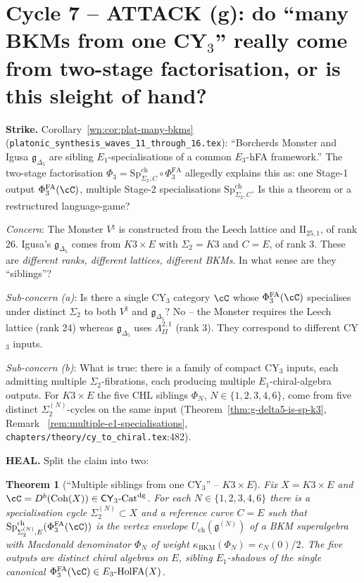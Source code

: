 \documentclass[11pt]{article}
\newtheorem{theorem}{Theorem}
\theoremstyle{definition}
\providecommand{\CY}{\mathsf{CY}}
\providecommand{\PhiFA}{\Phi^{\mathrm{FA}}}
\providecommand{\SpCh}{\mathrm{Sp}^{\mathrm{ch}}}
\providecommand{\HolFA}{\mathrm{HolFA}}
\providecommand{\Eone}{E_1}
\providecommand{\Coh}{\mathrm{Coh}}
\providecommand{\kBKM}{\kappa_{\mathrm{BKM}}}
\begin{document}
\section*{Cycle 7 -- ATTACK (g): do ``many BKMs from one CY$_3$'' really
come from two-stage factorisation, or is this sleight of hand?}

\noindent\textbf{Strike.} Corollary~\ref{wn:cor:plat-many-bkms}
(\texttt{platonic\_synthesis\_waves\_11\_through\_16.tex}): ``Borcherds
Monster and Igusa $\mathfrak g_{\Delta_5}$ are sibling $E_1$-specialisations
of a common $E_3$-hFA framework.'' The two-stage factorisation
$\Phi_3 = \SpCh_{\Sigma_2, C} \circ \PhiFA_3$ allegedly explains this
as: one Stage-1 output $\PhiFA_3(\cC)$, multiple Stage-2
specialisations $\SpCh_{\Sigma_2, C}$. Is this a theorem or a
restructured language-game?

\smallskip
\emph{Concern}: The Monster $V^\natural$ is constructed from the Leech
lattice and $\mathrm{II}_{25,1}$, of rank 26. Igusa's $\mathfrak{g}_{\Delta_5}$
comes from $K3 \times E$ with $\Sigma_2 = K3$ and $C = E$, of rank 3.
These are \emph{different ranks, different lattices, different BKMs}.
In what sense are they ``siblings''?

\emph{Sub-concern (a)}: Is there a single CY$_3$ category $\cC$ whose
$\PhiFA_3(\cC)$ specialises under distinct $\Sigma_2$ to both $V^\natural$
and $\mathfrak{g}_{\Delta_5}$?  No -- the Monster requires the Leech
lattice (rank 24) whereas $\mathfrak g_{\Delta_5}$ uses
$\Lambda^{2,1}_{II}$ (rank 3). They correspond to different CY$_3$
inputs.

\emph{Sub-concern (b)}: What is true: there is a family of compact
CY$_3$ inputs, each admitting multiple $\Sigma_2$-fibrations, each
producing multiple $\Eone$-chiral-algebra outputs. For $K3 \times E$
the five CHL siblings $\Phi_N$, $N \in \{1, 2, 3, 4, 6\}$, come from
five distinct $\Sigma_2^{(N)}$-cycles on the same input
(Theorem~\ref{thm:g-delta5-is-sp-k3}, Remark
~\ref{rem:multiple-e1-specialisations},
\texttt{chapters/theory/cy\_to\_chiral.tex}:482).

\smallskip
\noindent\textbf{HEAL.} Split the claim into two:

\begin{theorem}[``Multiple siblings from one CY$_3$'' -- $K3 \times E$]
\label{thm:multi-siblings-k3e}
Fix $X = K3 \times E$ and $\cC = D^b(\Coh(X)) \in \CY_3\text{-}\mathrm{Cat}^{\mathrm{dg}}$.
For each $N \in \{1, 2, 3, 4, 6\}$ there is a specialisation cycle
$\Sigma_2^{(N)} \subset X$ and a reference curve $C = E$ such that
$\SpCh_{\Sigma_2^{(N)}, E}(\PhiFA_3(\cC))$ is the vertex envelope
$U_{\mathrm{ch}}(\mathfrak g^{(N)})$ of a BKM superalgebra with
Macdonald denominator $\Phi_N$ of weight $\kBKM(\Phi_N) = c_N(0)/2$.
The five outputs are distinct chiral algebras on $E$, sibling
$\Eone$-shadows of the single canonical
$\PhiFA_3(\cC) \in E_3\text{-}\HolFA(X)$.
\end{theorem}
\end{document}
